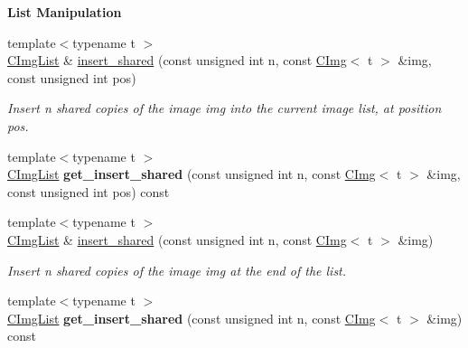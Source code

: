 \begin{Indent}{\bf List Manipulation}
\begin{DoxyCompactItemize}
\item 
\hypertarget{structcimg__library_1_1_c_img_list_ae072b096ecb9dd9e44484e9f232638a3}{
{\footnotesize template$<$typename t $>$ }\\\hyperlink{structcimg__library_1_1_c_img_list}{CImgList} \& \hyperlink{structcimg__library_1_1_c_img_list_ae072b096ecb9dd9e44484e9f232638a3}{insert\_\-shared} (const unsigned int n, const \hyperlink{structcimg__library_1_1_c_img}{CImg}$<$ t $>$ \&img, const unsigned int pos)}
\label{structcimg__library_1_1_c_img_list_ae072b096ecb9dd9e44484e9f232638a3}

\begin{DoxyCompactList}\small\item\em Insert n shared copies of the image {\ttfamily img} into the current image list, at position {\ttfamily pos}. \item\end{DoxyCompactList}\item 
\hypertarget{structcimg__library_1_1_c_img_list_a5e82eb465c885549dff6f106349d1eff}{
{\footnotesize template$<$typename t $>$ }\\\hyperlink{structcimg__library_1_1_c_img_list}{CImgList} {\bfseries get\_\-insert\_\-shared} (const unsigned int n, const \hyperlink{structcimg__library_1_1_c_img}{CImg}$<$ t $>$ \&img, const unsigned int pos) const }
\label{structcimg__library_1_1_c_img_list_a5e82eb465c885549dff6f106349d1eff}

\item 
\hypertarget{structcimg__library_1_1_c_img_list_a768ef96a5cfa4aa6d18c648ff02bb769}{
{\footnotesize template$<$typename t $>$ }\\\hyperlink{structcimg__library_1_1_c_img_list}{CImgList} \& \hyperlink{structcimg__library_1_1_c_img_list_a768ef96a5cfa4aa6d18c648ff02bb769}{insert\_\-shared} (const unsigned int n, const \hyperlink{structcimg__library_1_1_c_img}{CImg}$<$ t $>$ \&img)}
\label{structcimg__library_1_1_c_img_list_a768ef96a5cfa4aa6d18c648ff02bb769}

\begin{DoxyCompactList}\small\item\em Insert n shared copies of the image {\ttfamily img} at the end of the list. \item\end{DoxyCompactList}\item 
\hypertarget{structcimg__library_1_1_c_img_list_aa4c383ca7550aba1528fedf6431a2389}{
{\footnotesize template$<$typename t $>$ }\\\hyperlink{structcimg__library_1_1_c_img_list}{CImgList} {\bfseries get\_\-insert\_\-shared} (const unsigned int n, const \hyperlink{structcimg__library_1_1_c_img}{CImg}$<$ t $>$ \&img) const }
\label{structcimg__library_1_1_c_img_list_aa4c383ca7550aba1528fedf6431a2389}


\end{DoxyCompactItemize}
\end{Indent}
